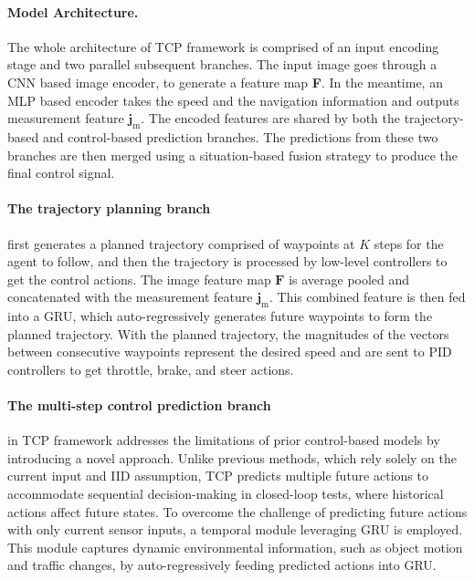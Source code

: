 \paragraph{Model Architecture.} The whole architecture of TCP framework is comprised of an input encoding stage and two parallel subsequent branches. The input image goes through a CNN based image encoder, to generate a feature map \textbf{F}. In the meantime, an MLP based encoder takes the speed and the navigation information and outputs measurement feature $\textbf{j}_\text{m}$. The encoded features are shared by both the trajectory-based and control-based prediction branches. The predictions from these two branches are then merged using a situation-based fusion strategy to produce the final control signal.

\paragraph{The trajectory planning branch} first generates a planned trajectory comprised of waypoints at $K$ steps for the agent to follow, and then the trajectory is processed by low-level controllers to get the control actions. The image feature map \(\textbf{F}\) is average pooled and concatenated with the measurement feature \(\textbf{j}_\text{m}\). This combined feature is then fed into a GRU, which auto-regressively generates future waypoints to form the planned trajectory. With the planned trajectory, the magnitudes of the vectors between consecutive waypoints represent the desired speed and are sent to PID controllers to get throttle, brake, and steer actions.

\paragraph{The multi-step control prediction branch} in TCP framework addresses the limitations of prior control-based models by introducing a novel approach. Unlike previous methods, which rely solely on the current input and IID assumption, TCP predicts multiple future actions to accommodate sequential decision-making in closed-loop tests, where historical actions affect future states. To overcome the challenge of predicting future actions with only current sensor inputs, a temporal module leveraging GRU is employed. This module captures dynamic environmental information, such as object motion and traffic changes, by auto-regressively feeding predicted actions into GRU. 

